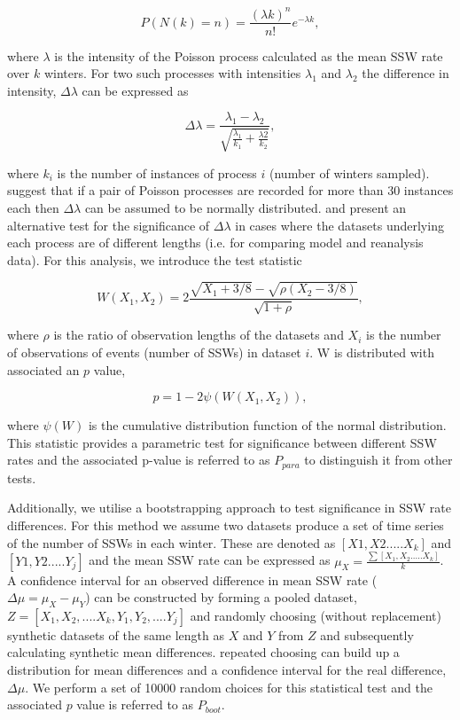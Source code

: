 \begin{equation} \label{Poisson}
P(N(k) = n) = \frac{(\lambda k)^n}{n!} e^{-\lambda k},
\end{equation}

where $\lambda$ is the intensity of the Poisson process calculated as the mean SSW rate over $k$ winters. For two such processes with intensities $\lambda_1$ and $\lambda_2$ the difference in intensity, $\Delta\lambda$ can be expressed as

\begin{equation} \label{Poisson}
\Delta\lambda = \frac{\lambda_1 - \lambda_2}{\sqrt{\frac{\lambda_1}{k_1} + \frac{\lambda2}{k_2}}},
\end{equation}

where $k_i$ is the number of instances of process $i$ (number of winters sampled). \cite{Charlton2007} suggest that if a pair of Poisson processes are recorded for more than 30 instances each then $\Delta\lambda$ can be assumed to be normally distributed. \cite{Gu} and \cite{Huffman} present an alternative test for the significance of $\Delta\lambda$ in cases where the datasets underlying each process are of different lengths (i.e. for comparing model and reanalysis data). For this analysis, we introduce the test statistic

\begin{equation} \label{deltalambda}
W(X_1, X_2) = 2 \frac{\sqrt{X_1 + 3/8} - \sqrt{\rho(X_2 - 3/8)}}
{\sqrt{1 + \rho}},
\end{equation}

where $\rho$ is the ratio of observation lengths of the datasets and $X_i$ is the number of observations of events (number of SSWs) in dataset $i$. W is distributed with associated an $p$ value, 

\begin{equation} \label{Pval}
p = 1-2\psi(W(X_1, X_2)),
\end{equation}

where $\psi(W)$ is the cumulative distribution function of the normal distribution. This statistic provides a parametric test for significance between different SSW rates and the associated p-value is referred to as $P_{para}$ to distinguish it from other tests. 

Additionally, we utilise a bootstrapping approach to test significance in SSW rate differences. For this method we assume two datasets produce a set of time series of the number of SSWs in each winter. These are denoted as $[X1,X2.....X_k]$ and $[Y1,Y2.....Y_j]$ and the mean SSW rate can be expressed as $\mu_X = \frac{\sum[X_1,X_2.....X_k]}{k}$. A confidence interval for an observed difference in mean SSW rate ($\Delta\mu = \mu_X - \mu_Y$) can be constructed by forming a pooled dataset, $Z = [X_1, X_2,....X_k,Y_1,Y_2,....Y_j]$ and randomly choosing (without replacement) synthetic datasets of the same length as $X$ and $Y$ from $Z$ and subsequently calculating synthetic mean differences. repeated choosing can build up a distribution for mean differences and a confidence interval for the real difference, $\Delta\mu$. We perform a set of 10000 random choices for this statistical test and the associated $p$ value is referred to as $P_{boot}$.


